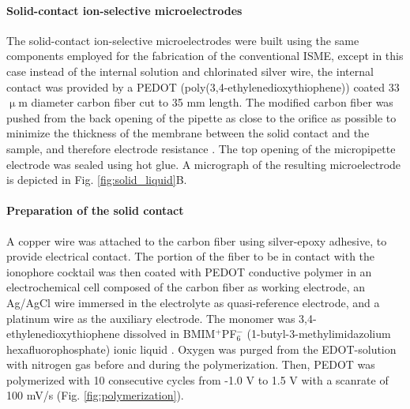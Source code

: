 				\paragraph{Solid-contact ion-selective microelectrodes}
The solid-contact ion-selective microelectrodes were built using the same components employed for the fabrication of the conventional ISME, except in this case instead of the internal solution and chlorinated silver wire, the internal contact was provided by a PEDOT (poly(3,4-ethylenedioxythiophene)) coated 33 $\upmu$m diameter carbon fiber cut to 35 mm length.
The modified carbon fiber was pushed from the back opening of the pipette as close to the orifice as possible to minimize the thickness of the membrane between the solid contact and the sample, and therefore electrode resistance \cite{gyetvai2007solid}.
The top opening of the micropipette electrode was sealed using hot glue.
A micrograph of the resulting microelectrode is depicted in Fig. \ref{fig:solid_liquid}B.
				\paragraph{Preparation of the solid contact}
A copper wire was attached to the carbon fiber using silver-epoxy adhesive, to provide electrical contact.
The portion of the fiber to be in contact with the ionophore cocktail was then coated with PEDOT conductive polymer in an electrochemical cell composed of the carbon fiber as working electrode, an Ag/AgCl wire immersed in the electrolyte as quasi-reference electrode, and a platinum wire as the auxiliary electrode.
The monomer was 3,4-ethylenedioxythiophene dissolved in BMIM$^+$PF$_6^-$ (1-butyl-3-methylimidazolium hexafluorophosphate) ionic liquid \cite{gyetvai2007solid}.
Oxygen was purged from the EDOT-solution with nitrogen gas before and during the polymerization.
Then, PEDOT was polymerized with 10 consecutive cycles from -1.0 V to 1.5 V with a scanrate of 100 mV/s (Fig. \ref{fig:polymerization}).

